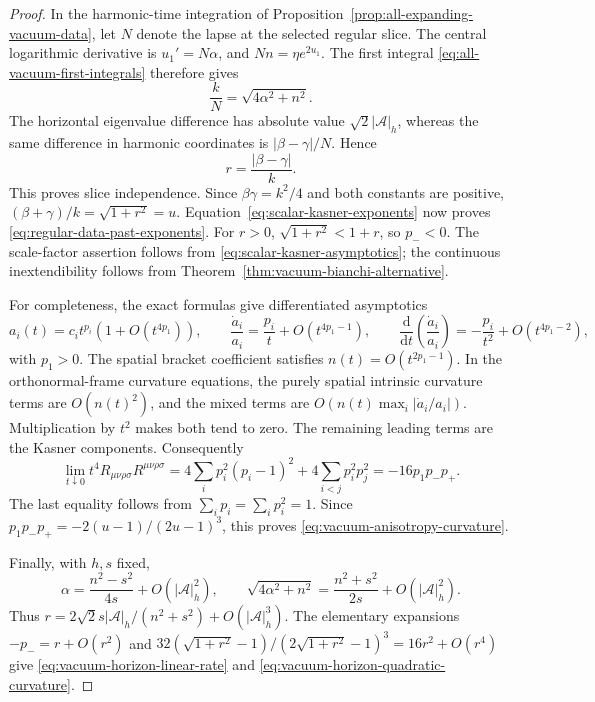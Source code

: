 \documentclass[10pt,a4paper]{article}
\numberwithin{equation}{section}
\theoremstyle{definition}
\theoremstyle{remark}
\newcommand{\dd}{\mathrm d}
\begin{document}
\begin{proof}
In the harmonic-time integration of
Proposition~\ref{prop:all-expanding-vacuum-data}, let $N$ denote the
lapse at the selected regular slice.  The central logarithmic
derivative is $u_1'=N\alpha$, and $Nn=\eta e^{2u_1}$.
The first integral
\eqref{eq:all-vacuum-first-integrals} therefore gives
\[
 \frac{k}{N}=\sqrt{4\alpha^2+n^2}.
\]
The horizontal eigenvalue difference has absolute value
$\sqrt2|\mathcal A|_h$, whereas the same difference in harmonic
coordinates is $|\beta-\gamma|/N$.  Hence
\begin{equation}
 r=\frac{|\beta-\gamma|}{k}.
 \label{eq:invariant-vacuum-first-integral}
\end{equation}
This proves slice independence.  Since $\beta\gamma=k^2/4$ and both
constants are positive,
$(\beta+\gamma)/k=\sqrt{1+r^2}=u$.
Equation~\eqref{eq:scalar-kasner-exponents} now proves
\eqref{eq:regular-data-past-exponents}.  For $r>0$,
$\sqrt{1+r^2}<1+r$, so $p_-<0$.  The scale-factor assertion follows
from \eqref{eq:scalar-kasner-asymptotics}; the continuous
inextendibility follows from
Theorem~\ref{thm:vacuum-bianchi-alternative}.

For completeness, the exact formulas give differentiated asymptotics
\[
 a_i(t)=c_i t^{p_i}(1+O(t^{4p_1})),\qquad
 \frac{\dot a_i}{a_i}=\frac{p_i}{t}+O(t^{4p_1-1}),\qquad
 \frac{\dd}{\dd t}\left(\frac{\dot a_i}{a_i}\right)
 =-\frac{p_i}{t^2}+O(t^{4p_1-2}),
\]
with $p_1>0$.  The spatial bracket coefficient satisfies
$n(t)=O(t^{2p_1-1})$.  In the orthonormal-frame curvature equations,
the purely spatial intrinsic curvature terms are $O(n(t)^2)$,
and the mixed terms are
$O(n(t)\max_i|\dot a_i/a_i|)$.  Multiplication by $t^2$ makes
both tend to zero.  The remaining leading terms are the Kasner
components.  Consequently
\[
 \lim_{t\downarrow0}t^4
 R_{\mu\nu\rho\sigma}R^{\mu\nu\rho\sigma}
 =4\sum_i p_i^2(p_i-1)^2
   +4\sum_{i<j}p_i^2p_j^2
 =-16p_1p_-p_+.
\]
The last equality follows from
$\sum_i p_i=\sum_i p_i^2=1$.
Since
$p_1p_-p_+=-2(u-1)/(2u-1)^3$,
this proves \eqref{eq:vacuum-anisotropy-curvature}.

Finally, with $h,s$ fixed,
\[
 \alpha=\frac{n^2-s^2}{4s}+O(|\mathcal A|_h^2),\qquad
 \sqrt{4\alpha^2+n^2}
 =\frac{n^2+s^2}{2s}+O(|\mathcal A|_h^2).
\]
Thus
$r=2\sqrt2s|\mathcal A|_h/(n^2+s^2)
+O(|\mathcal A|_h^3)$.
The elementary expansions
$-p_-=r+O(r^2)$ and
$32(\sqrt{1+r^2}-1)/(2\sqrt{1+r^2}-1)^3
=16r^2+O(r^4)$ give
\eqref{eq:vacuum-horizon-linear-rate} and
\eqref{eq:vacuum-horizon-quadratic-curvature}.
\end{proof}
\end{document}

